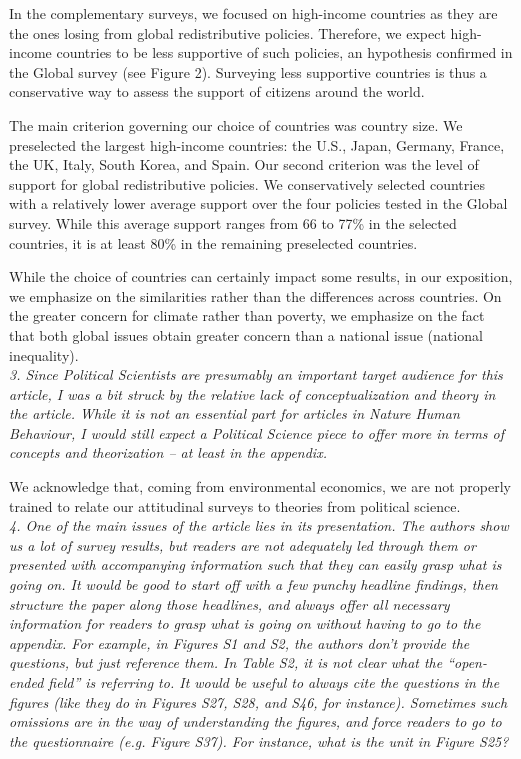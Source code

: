 \documentclass[12pt,english]{article}
\begin{document}
In the complementary surveys, we focused on high-income countries as they are the ones losing from global redistributive policies. Therefore, we expect high-income countries to be less supportive of such policies, an hypothesis confirmed in the Global survey (see Figure 2). Surveying less supportive countries is thus a conservative way to assess the support of citizens around the world. 

The main criterion governing our choice of countries was country size. We preselected the largest high-income countries: the U.S., Japan, Germany, France, the UK, Italy, South Korea, and Spain. Our second criterion was the level of support for global redistributive policies. We conservatively selected countries with a relatively lower average support over the four policies tested in the Global survey. While this average support ranges from 66 to 77\% in the selected countries, it is at least 80\% in the remaining preselected countries.

While the choice of countries can certainly impact some results, in our exposition, we emphasize on the similarities rather than the differences across countries. On the greater concern for climate rather than poverty, we emphasize on the fact that both global issues obtain greater concern than a national issue (national inequality). 
~\\

\textit{3. Since Political Scientists are presumably an important target audience for this article, I was a bit struck by the relative lack of conceptualization and theory in the article. While it is not an essential part for articles in Nature Human Behaviour, I would still expect a Political Science piece to offer more in terms of concepts and theorization – at least in the appendix.}

We acknowledge that, coming from environmental economics, we are not properly trained to relate our attitudinal surveys to theories from political science. %
~\\

\textit{4. One of the main issues of the article lies in its presentation. The authors show us a lot of survey results, but readers are not adequately led through them or presented with accompanying information such that they can easily grasp what is going on. It would be good to start off with a few punchy headline findings, then structure the paper along those headlines, and always offer all necessary information for readers to grasp what is going on without having to go to the appendix. For example, in Figures S1 and S2, the authors don’t provide the questions, but just reference them. In Table S2, it is not clear what the “open-ended field” is referring to. It would be useful to always cite the questions in the figures (like they do in Figures S27, S28, and S46, for instance). Sometimes such omissions are in the way of understanding the figures, and force readers to go to the questionnaire (e.g. Figure S37). For instance, what is the unit in Figure S25?}
\end{document}

